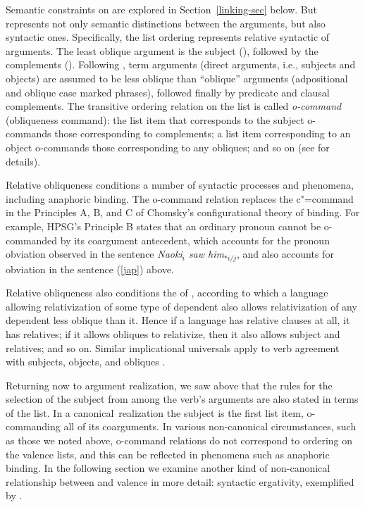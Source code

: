 \documentclass[output=paper,biblatex,babelshorthands,newtxmath,draftmode,colorlinks, citecolor=brown]{langscibook}
\begin{document}
Semantic constraints on \argst are explored in Section~\ref{linking-sec} below.  But \argst represents not only
semantic distinctions between the arguments, but also  %
syntactic  ones.  Specifically, the list ordering represents relative syntactic 
of arguments.   The least oblique argument is the subject (\subj), followed by the complements
(\comps).  Following \citet{Manning1996}, term arguments (direct arguments, i.e., subjects and
objects) are  assumed to be less oblique than ``oblique'' arguments (adpositional and oblique case
marked phrases), followed finally by predicate and clausal complements.  The transitive ordering
relation on the \argst list is called \textit{o-command} (obliqueness
command): the list item that corresponds to the
subject o-commands those corresponding to complements; a list item corresponding to an object
o-commands those corresponding to any obliques; and so on (see
 for details). 
 
Relative obliqueness conditions a number of syntactic processes and phenomena, including anaphoric
binding.  The o-command relation replaces the c"=command in the Principles A, B, and C of Chomsky's
\citeyearpar{Chomsky:1981} configurational theory of binding.  For example, HPSG's Principle B
states that an ordinary pronoun cannot be o-commanded by its coargument antecedent, which accounts
for the pronoun obviation observed in the  sentence \textit{Naoki$_i$ saw
  him$_{*i/j}$}, and also accounts for obviation in the  sentence (\ref{jap}) above.

Relative obliqueness also conditions the  of
\citet{KeenanandComrie1977}, according to which a language allowing relativization of some type of
dependent also allows relativization of any dependent less oblique than it.  Hence if a language has relative
clauses at all, it has  relatives; if it allows obliques to relativize, then it also allows
subject and  relatives; and so on. Similar implicational universals apply to verb agreement
with subjects, objects, and obliques \citep{greenberg:1966}. 

\largerpage
Returning now to argument realization, we saw above that the rules for the selection of the subject
from among the verb's arguments are also stated in terms of the \argst list.  In a canonical\
realization the subject is the first list item, o-commanding all of its coarguments.
In various non-canonical circumstances, such as those we noted above, o-command relations do not
correspond to ordering on the valence lists, and this can be reflected in phenomena such as
anaphoric binding.  In the following section we examine another kind of non-canonical relationship
between \argst and valence in more detail: syntactic ergativity, exemplified by \ili{Balinese}.
\end{document}
